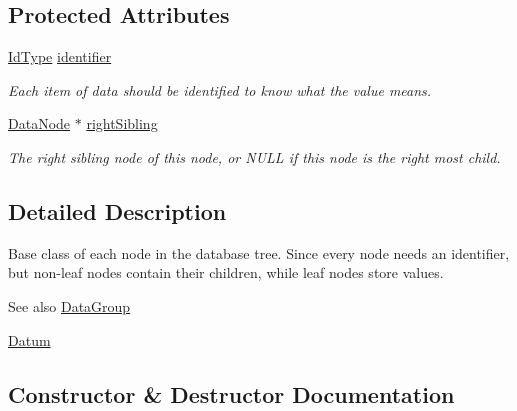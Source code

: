 \subsection*{Protected Attributes}
\begin{DoxyCompactItemize}
\item 
\hyperlink{namespaceDatabase_abca840aa37b2fd02e1d82e32a8171437}{Id\+Type} \hyperlink{classDatabase_1_1DataNode_a2417b60924a11cf9157b996fbf7b2ca5}{identifier}\hypertarget{classDatabase_1_1DataNode_a2417b60924a11cf9157b996fbf7b2ca5}{}\label{classDatabase_1_1DataNode_a2417b60924a11cf9157b996fbf7b2ca5}

\begin{DoxyCompactList}\small\item\em Each item of data should be identified to know what the value means. \end{DoxyCompactList}\item 
\hyperlink{classDatabase_1_1DataNode}{Data\+Node} $\ast$ \hyperlink{classDatabase_1_1DataNode_ae335fc33c3813e8a6638d50faef44d5d}{right\+Sibling}\hypertarget{classDatabase_1_1DataNode_ae335fc33c3813e8a6638d50faef44d5d}{}\label{classDatabase_1_1DataNode_ae335fc33c3813e8a6638d50faef44d5d}

\begin{DoxyCompactList}\small\item\em The right sibling node of this node, or N\+U\+LL if this node is the right most child. \end{DoxyCompactList}\end{DoxyCompactItemize}


\subsection{Detailed Description}
Base class of each node in the database tree. Since every node needs an identifier, but non-\/leaf nodes contain their children, while leaf nodes store values. 

\begin{DoxySeeAlso}{See also}
\hyperlink{classDatabase_1_1DataGroup}{Data\+Group} 

\hyperlink{classDatabase_1_1Datum}{Datum} 
\end{DoxySeeAlso}


\subsection{Constructor \& Destructor Documentation}
